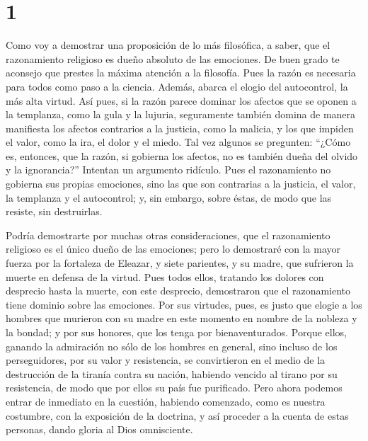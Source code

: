 \hypertarget{section}{%
\section{1}\label{section}}

 Como voy a demostrar una proposición de lo más
filosófica, a saber, que el razonamiento religioso es dueño absoluto de
las emociones. De buen grado te aconsejo que prestes la máxima atención
a la filosofía.  Pues la razón es necesaria para todos
como paso a la ciencia. Además, abarca el elogio del autocontrol, la más
alta virtud.  Así pues, si la razón parece dominar los
afectos que se oponen a la templanza, como la gula y la lujuria,
 seguramente también domina de manera manifiesta los
afectos contrarios a la justicia, como la malicia, y los que impiden el
valor, como la ira, el dolor y el miedo.  Tal vez algunos
se pregunten: ``¿Cómo es, entonces, que la razón, si gobierna los
afectos, no es también dueña del olvido y la ignorancia?'' Intentan un
argumento ridículo.  Pues el razonamiento no gobierna sus
propias emociones, sino las que son contrarias a la justicia, el valor,
la templanza y el autocontrol; y, sin embargo, sobre éstas, de modo que
las resiste, sin destruirlas.

 Podría demostrarte por muchas otras consideraciones, que
el razonamiento religioso es el único dueño de las emociones;
 pero lo demostraré con la mayor fuerza por la fortaleza
de Eleazar, y siete parientes, y su madre, que sufrieron la muerte en
defensa de la virtud.  Pues todos ellos, tratando los
dolores con desprecio hasta la muerte, con este desprecio, demostraron
que el razonamiento tiene dominio sobre las emociones. 
Por sus virtudes, pues, es justo que elogie a los hombres que murieron
con su madre en este momento en nombre de la nobleza y la bondad; y por
sus honores, que los tenga por bienaventurados.  Porque
ellos, ganando la admiración no sólo de los hombres en general, sino
incluso de los perseguidores, por su valor y resistencia, se
convirtieron en el medio de la destrucción de la tiranía contra su
nación, habiendo vencido al tirano por su resistencia, de modo que por
ellos su país fue purificado.  Pero ahora podemos entrar
de inmediato en la cuestión, habiendo comenzado, como es nuestra
costumbre, con la exposición de la doctrina, y así proceder a la cuenta
de estas personas, dando gloria al Dios omnisciente.

